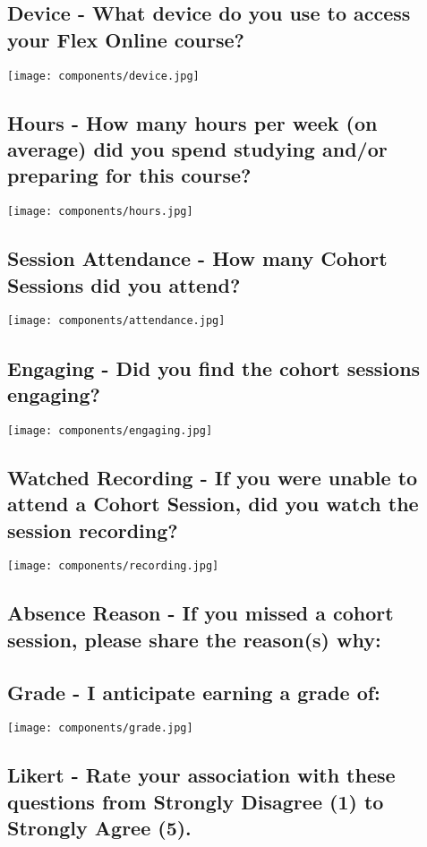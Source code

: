 \documentclass[11pt]{article}
\begin{document}
\subsection{Device - What device do you use to access your Flex Online course?}
\texttt{[image: components/device.jpg]}

\subsection{Hours - How many hours per week (on average) did you spend studying and/or preparing for this course?}
\texttt{[image: components/hours.jpg]}

\subsection{Session Attendance - How many Cohort Sessions did you attend?}
\texttt{[image: components/attendance.jpg]}

\subsection{Engaging - Did you find the cohort sessions engaging?}
\texttt{[image: components/engaging.jpg]}

\subsection{Watched Recording - If you were unable to attend a Cohort Session, did you watch the session recording?}
\texttt{[image: components/recording.jpg]}

\subsection{Absence Reason - If you missed a cohort session, please share the reason(s) why:}


\subsection{Grade - I anticipate earning a grade of:}
\texttt{[image: components/grade.jpg]}

\subsection{Likert - Rate your association with these questions from Strongly Disagree (1) to Strongly Agree (5).}

\end{document}
